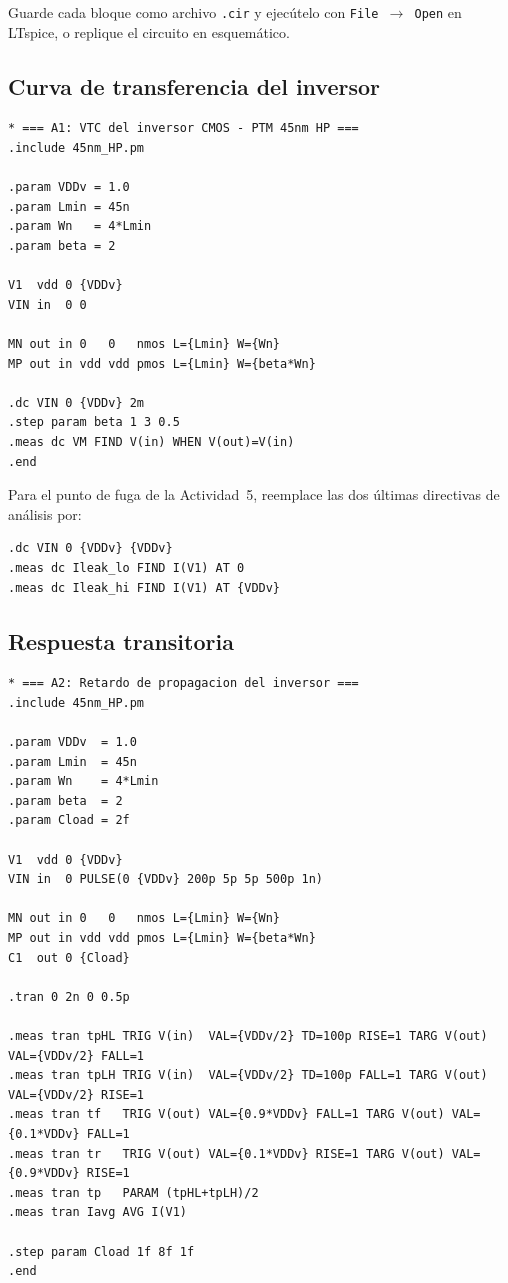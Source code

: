 \documentclass[11pt,a4paper]{article}
\begin{document}
Guarde cada bloque como archivo \texttt{.cir} y ejecútelo con \texttt{File $\rightarrow$ Open} en LTspice, o replique el circuito en esquemático.

\subsection{Curva de transferencia del inversor}
\label{sec:a1}

\begin{lstlisting}
* === A1: VTC del inversor CMOS - PTM 45nm HP ===
.include 45nm_HP.pm

.param VDDv = 1.0
.param Lmin = 45n
.param Wn   = 4*Lmin
.param beta = 2

V1  vdd 0 {VDDv}
VIN in  0 0

MN out in 0   0   nmos L={Lmin} W={Wn}
MP out in vdd vdd pmos L={Lmin} W={beta*Wn}

.dc VIN 0 {VDDv} 2m
.step param beta 1 3 0.5
.meas dc VM FIND V(in) WHEN V(out)=V(in)
.end
\end{lstlisting}

Para el punto de fuga de la Actividad~5, reemplace las dos últimas directivas de análisis por:

\begin{lstlisting}
.dc VIN 0 {VDDv} {VDDv}
.meas dc Ileak_lo FIND I(V1) AT 0
.meas dc Ileak_hi FIND I(V1) AT {VDDv}
\end{lstlisting}

\subsection{Respuesta transitoria}
\label{sec:a2}

\begin{lstlisting}
* === A2: Retardo de propagacion del inversor ===
.include 45nm_HP.pm

.param VDDv  = 1.0
.param Lmin  = 45n
.param Wn    = 4*Lmin
.param beta  = 2
.param Cload = 2f

V1  vdd 0 {VDDv}
VIN in  0 PULSE(0 {VDDv} 200p 5p 5p 500p 1n)

MN out in 0   0   nmos L={Lmin} W={Wn}
MP out in vdd vdd pmos L={Lmin} W={beta*Wn}
C1  out 0 {Cload}

.tran 0 2n 0 0.5p

.meas tran tpHL TRIG V(in)  VAL={VDDv/2} TD=100p RISE=1 TARG V(out) VAL={VDDv/2} FALL=1
.meas tran tpLH TRIG V(in)  VAL={VDDv/2} TD=100p FALL=1 TARG V(out) VAL={VDDv/2} RISE=1
.meas tran tf   TRIG V(out) VAL={0.9*VDDv} FALL=1 TARG V(out) VAL={0.1*VDDv} FALL=1
.meas tran tr   TRIG V(out) VAL={0.1*VDDv} RISE=1 TARG V(out) VAL={0.9*VDDv} RISE=1
.meas tran tp   PARAM (tpHL+tpLH)/2
.meas tran Iavg AVG I(V1)

.step param Cload 1f 8f 1f
.end
\end{lstlisting}
\end{document}

